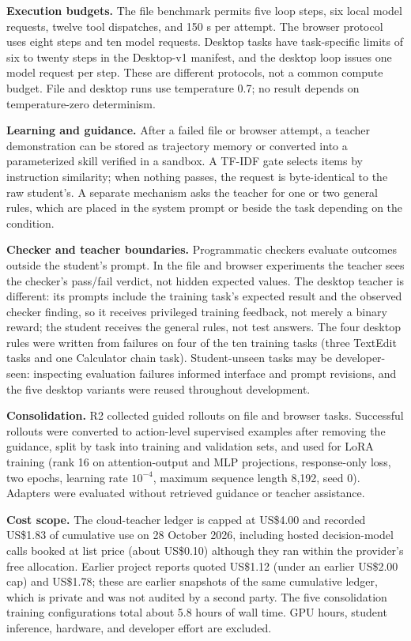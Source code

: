\documentclass[
  10pt,
]{article}
\begin{document}
\textbf{Execution budgets.} The file benchmark permits five loop steps,
six local model requests, twelve tool dispatches, and 150 s per attempt.
The browser protocol uses eight steps and ten model requests. Desktop
tasks have task-specific limits of six to twenty steps in the Desktop-v1
manifest, and the desktop loop issues one model request per step. These
are different protocols, not a common compute budget. File and desktop
runs use temperature 0.7; no result depends on temperature-zero
determinism.

\textbf{Learning and guidance.} After a failed file or browser attempt,
a teacher demonstration can be stored as trajectory memory or converted
into a parameterized skill verified in a sandbox. A TF-IDF gate selects
items by instruction similarity; when nothing passes, the request is
byte-identical to the raw student's. A separate mechanism asks the
teacher for one or two general rules, which are placed in the system
prompt or beside the task depending on the condition.

\textbf{Checker and teacher boundaries.} Programmatic checkers evaluate
outcomes outside the student's prompt. In the file and browser
experiments the teacher sees the checker's pass/fail verdict, not hidden
expected values. The desktop teacher is different: its prompts include
the training task's expected result and the observed checker finding, so
it receives privileged training feedback, not merely a binary reward;
the student receives the general rules, not test answers. The four
desktop rules were written from failures on four of the ten training
tasks (three TextEdit tasks and one Calculator chain task).
Student-unseen tasks may be developer-seen: inspecting evaluation
failures informed interface and prompt revisions, and the five desktop
variants were reused throughout development.

\textbf{Consolidation.} R2 collected guided rollouts on file and browser
tasks. Successful rollouts were converted to action-level supervised
examples after removing the guidance, split by task into training and
validation sets, and used for LoRA training (rank 16 on attention-output
and MLP projections, response-only loss, two epochs, learning rate
\(10^{-4}\), maximum sequence length 8,192, seed 0). Adapters were
evaluated without retrieved guidance or teacher assistance.

\textbf{Cost scope.} The cloud-teacher ledger is capped at US\$4.00 and
recorded US\$1.83 of cumulative use on 28 October 2026, including hosted
decision-model calls booked at list price (about US\$0.10) although they
ran within the provider's free allocation. Earlier project reports
quoted US\$1.12 (under an earlier US\$2.00 cap) and US\$1.78; these are
earlier snapshots of the same cumulative ledger, which is private and
was not audited by a second party. The five consolidation training
configurations total about 5.8 hours of wall time. GPU hours, student
inference, hardware, and developer effort are excluded.
\end{document}
